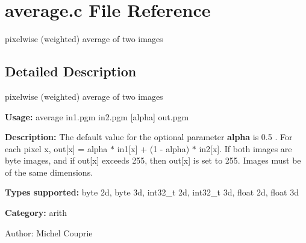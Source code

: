 \section{average.c File Reference}
\label{average_8c}
pixelwise (weighted) average of two images  




\label{_details}
\subsection{Detailed Description}
pixelwise (weighted) average of two images 

{\bf Usage:} average in1.pgm in2.pgm [alpha] out.pgm

{\bf Description:} The default value for the optional parameter {\bf alpha} is 0.5 . For each pixel x, out[x] = alpha $\ast$ in1[x] + (1 - alpha) $\ast$ in2[x]. If both images are byte images, and if out[x] exceeds 255, then out[x] is set to 255. Images must be of the same dimensions.

{\bf Types supported:} byte 2d, byte 3d, int32\_\-t 2d, int32\_\-t 3d, float 2d, float 3d

{\bf Category:} arith

\begin{Desc}
\item[Author:]Michel Couprie \end{Desc}
